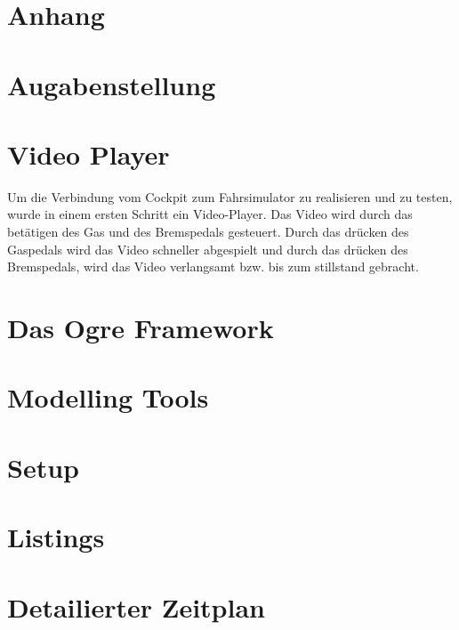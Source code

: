 \section{Anhang}
\appendix
\section{Augabenstellung}
\section{Video Player}
Um die Verbindung vom Cockpit zum Fahrsimulator zu realisieren und zu testen, wurde in einem ersten Schritt ein Video-Player. Das Video wird durch das betätigen des Gas und des Bremspedals gesteuert. Durch das drücken des Gaspedals wird das Video schneller abgespielt und durch das drücken des Bremspedals, wird das Video verlangsamt bzw. bis zum stillstand gebracht. 

\section{Das Ogre Framework}
\section{Modelling Tools}
\section{Setup}
\section{Listings}
\section{Detailierter Zeitplan}